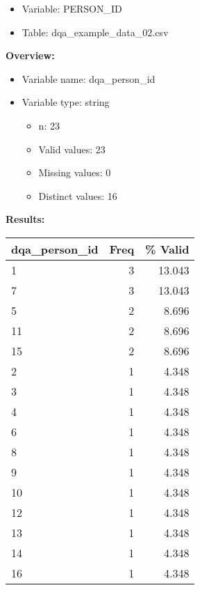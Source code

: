\documentclass[
]{article}
\providecommand{\tightlist}{%
  \setlength{\itemsep}{0pt}\setlength{\parskip}{0pt}}
\begin{document}
\begin{itemize}
\tightlist
\item
  Variable: PERSON\_ID
\item
  Table: dqa\_example\_data\_02.csv
\end{itemize}

\textbf{Overview:}

\begin{itemize}
\tightlist
\item
  Variable name: dqa\_person\_id
\item
  Variable type: string

  \begin{itemize}
  \tightlist
  \item
    n: 23
  \item
    Valid values: 23
  \item
    Missing values: 0
  \item
    Distinct values: 16
  \end{itemize}
\end{itemize}

\textbf{Results:}\\

\begin{table}[H]
\centering
\begin{tabular}{l|r|r}
\hline
\textbf{dqa\_person\_id} & \textbf{Freq} & \textbf{\% Valid}\\
\hline
1 & 3 & 13.043\\
\hline
7 & 3 & 13.043\\
\hline
5 & 2 & 8.696\\
\hline
11 & 2 & 8.696\\
\hline
15 & 2 & 8.696\\
\hline
2 & 1 & 4.348\\
\hline
3 & 1 & 4.348\\
\hline
4 & 1 & 4.348\\
\hline
6 & 1 & 4.348\\
\hline
8 & 1 & 4.348\\
\hline
9 & 1 & 4.348\\
\hline
10 & 1 & 4.348\\
\hline
12 & 1 & 4.348\\
\hline
13 & 1 & 4.348\\
\hline
14 & 1 & 4.348\\
\hline
16 & 1 & 4.348\\
\hline
\end{tabular}
\end{table}
\newpage
\end{document}
